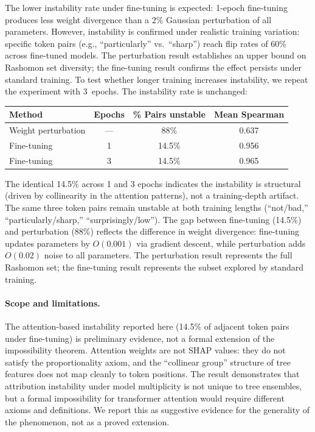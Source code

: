\documentclass{article}
\begin{document}
The lower instability rate under fine-tuning is expected: 1-epoch
fine-tuning produces less weight divergence than a 2\% Gaussian
perturbation of all parameters. However, instability is confirmed
under realistic training variation: specific token pairs (e.g.,
``particularly'' vs.\ ``sharp'') reach flip rates of 60\% across
fine-tuned models. The perturbation result establishes an upper
bound on Rashomon set diversity; the fine-tuning result confirms
the effect persists under standard training.
To test whether longer training increases instability, we repeat the
experiment with 3~epochs. The instability rate is unchanged:

\begin{center}
\small
\begin{tabular}{@{}lccc@{}}
\toprule
Method & Epochs & \% Pairs unstable & Mean Spearman \\
\midrule
Weight perturbation & --- & 88\% & 0.637 \\
Fine-tuning & 1 & 14.5\% & 0.956 \\
Fine-tuning & 3 & 14.5\% & 0.965 \\
\bottomrule
\end{tabular}
\end{center}

The identical 14.5\% across 1 and 3 epochs indicates the instability
is structural (driven by collinearity in the attention patterns), not
a training-depth artifact. The same three token pairs remain unstable
at both training lengths (``not/bad,'' ``particularly/sharp,''
``surprisingly/low''). The gap between fine-tuning (14.5\%) and
perturbation (88\%) reflects the difference in weight divergence:
fine-tuning updates parameters by $O(0.001)$ via gradient descent,
while perturbation adds $O(0.02)$ noise to all parameters. The
perturbation result represents the full Rashomon set; the fine-tuning
result represents the subset explored by standard training.

\paragraph{Scope and limitations.}
The attention-based instability reported here (14.5\% of adjacent token
pairs under fine-tuning) is preliminary evidence, not a formal extension
of the impossibility theorem. Attention weights are not SHAP values:
they do not satisfy the proportionality axiom, and the ``collinear
group'' structure of tree features does not map cleanly to token
positions. The result demonstrates that attribution instability under
model multiplicity is not unique to tree ensembles, but a formal
impossibility for transformer attention would require different axioms
and definitions. We report this as suggestive evidence for the
generality of the phenomenon, not as a proved extension.
\end{document}
